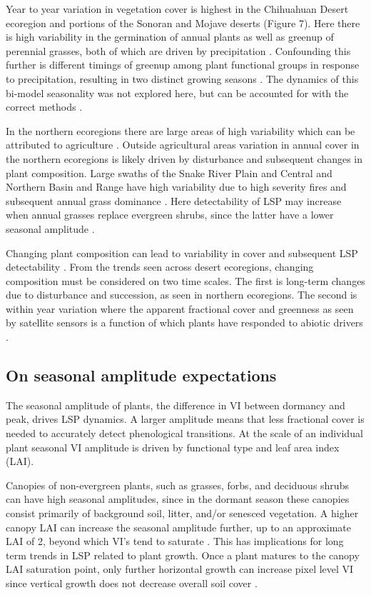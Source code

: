 \documentclass{article}
\begin{document}
Year to year variation in vegetation cover is highest in the Chihuahuan Desert ecoregion and portions of the Sonoran and Mojave deserts (Figure 7). Here there is high variability in the germination of annual plants as well as greenup of perennial grasses, both of which are driven by precipitation \cite{beatley1974a, browning2017b}. Confounding this further is different timings of greenup among plant functional groups in response to precipitation, resulting in two distinct growing seasons \cite{ernest2000, weiss2004, browning2018}. The dynamics of this bi-model seasonality was not explored here, but can be accounted for with the correct methods \cite{gray2019, buitenwerf2015}.

In the northern ecoregions there are large areas of high variability which can be attributed to agriculture \cite{bradley2008}. Outside agricultural areas variation in annual cover in the northern ecoregions is likely driven by disturbance and subsequent changes in plant composition. Large swaths of the Snake River Plain and Central and Northern Basin and Range have high variability due to high severity fires and subsequent annual grass dominance \cite{bradley2018, pastick2020}. Here detectability of LSP may increase when annual grasses replace evergreen shrubs, since the latter have a lower seasonal amplitude \cite{peng2021}.  

Changing plant composition can lead to variability in cover and subsequent LSP detectability \cite{chen-wang2018}. From the trends seen across desert ecoregions, changing composition must be considered on two time scales. The first is long-term changes due to disturbance and succession, as seen in northern ecoregions. The second is within year variation where the apparent fractional cover and greenness as seen by satellite sensors is a function of which plants have responded to abiotic drivers \cite{helman2018}. 

\subsection{On seasonal amplitude expectations}
The seasonal amplitude of plants, the difference in VI between dormancy and peak, drives LSP dynamics. A larger amplitude means that less fractional cover is needed to accurately detect phenological transitions. At the scale of an individual plant seasonal VI amplitude is driven by functional type and leaf area index (LAI).

Canopies of non-evergreen plants, such as grasses, forbs, and deciduous shrubs can have high seasonal amplitudes, since in the dormant season these canopies consist primarily of background soil, litter, and/or senesced vegetation. A higher canopy LAI can increase the seasonal amplitude further, up to an approximate LAI of 2, beyond which VI’s tend to saturate \cite{smith2019}. This has implications for long term trends in LSP related to plant growth. Once a plant matures to the canopy LAI saturation point, only further horizontal growth can increase pixel level VI since vertical growth does not decrease overall soil cover \cite{gamon1995, carlson1997}.
\end{document}
